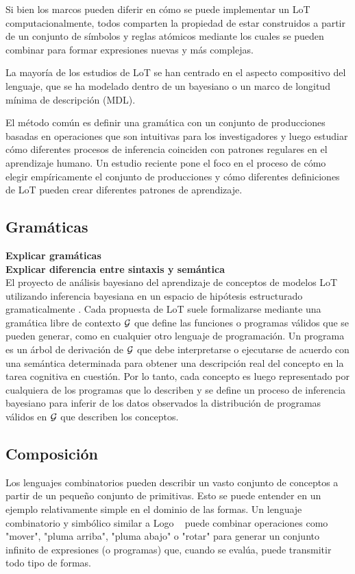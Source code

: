 Si bien los marcos pueden diferir en cómo se puede implementar un LoT computacionalmente, todos comparten la propiedad de estar construidos a partir de un conjunto de símbolos y reglas atómicos mediante los cuales se pueden combinar para formar expresiones nuevas y más complejas. 

La mayoría de los estudios de LoT se han centrado en el aspecto compositivo del lenguaje, que se ha modelado dentro de un \cite{tenenbaum2011grow} bayesiano o un marco \cite{marie2016, goldsmith2002probabilistic, romano2013language, goldsmith2001unsupervised} de longitud mínima de descripción (MDL).

El método común es definir una gramática con un conjunto de producciones basadas en operaciones que son intuitivas para los investigadores y luego estudiar cómo diferentes procesos de inferencia coinciden con patrones regulares en el aprendizaje humano. Un estudio reciente \cite{piantadosi2016logical} pone el foco en el proceso de cómo elegir empíricamente el conjunto de producciones y cómo diferentes definiciones de LoT pueden crear diferentes patrones de aprendizaje. 


\subsection{Gramáticas}


\textbf{Explicar gramáticas}\\
\textbf{Explicar diferencia entre sintaxis y semántica}\\

El proyecto de análisis bayesiano del aprendizaje de conceptos de modelos LoT utilizando inferencia bayesiana en un espacio de hipótesis estructurado gramaticalmente \cite{goodman2008rational}. Cada propuesta de LoT suele formalizarse mediante una gramática libre de contexto $ \gram $ que define las funciones o programas válidos que se pueden generar, como en cualquier otro lenguaje de programación. Un programa es un árbol de derivación de $ \gram $ que debe interpretarse o ejecutarse de acuerdo con una semántica determinada para obtener una descripción real del concepto en la tarea cognitiva en cuestión. Por lo tanto, cada concepto es luego representado por cualquiera de los programas que lo describen y se define un proceso de inferencia bayesiano para inferir de los datos observados la distribución de programas válidos en $ \gram $ que describen los conceptos.

\subsection{Composición}
Los lenguajes combinatorios pueden describir un vasto conjunto de conceptos a partir de un pequeño conjunto de primitivas. Esto se puede entender en un ejemplo relativamente simple en el dominio de las formas. Un lenguaje combinatorio y simbólico similar a Logo ~\cite{abelson1974logo} puede combinar operaciones como "mover", "pluma arriba", "pluma abajo" o "rotar" para generar un conjunto infinito de expresiones (o programas) que, cuando se evalúa, puede transmitir todo tipo de formas.

